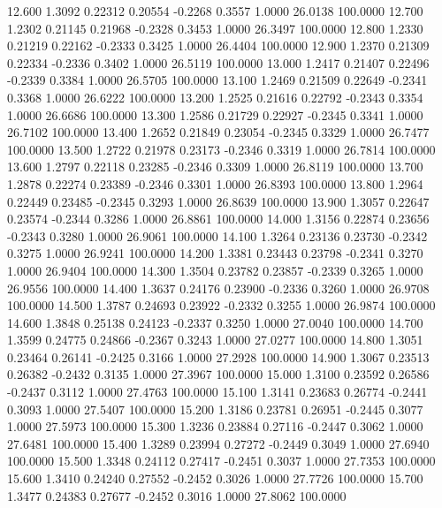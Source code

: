   12.600   1.3092   0.22312   0.20554  -0.2268   0.3557   1.0000  26.0138 100.0000
  12.700   1.2302   0.21145   0.21968  -0.2328   0.3453   1.0000  26.3497 100.0000
  12.800   1.2330   0.21219   0.22162  -0.2333   0.3425   1.0000  26.4404 100.0000
  12.900   1.2370   0.21309   0.22334  -0.2336   0.3402   1.0000  26.5119 100.0000
  13.000   1.2417   0.21407   0.22496  -0.2339   0.3384   1.0000  26.5705 100.0000
  13.100   1.2469   0.21509   0.22649  -0.2341   0.3368   1.0000  26.6222 100.0000
  13.200   1.2525   0.21616   0.22792  -0.2343   0.3354   1.0000  26.6686 100.0000
  13.300   1.2586   0.21729   0.22927  -0.2345   0.3341   1.0000  26.7102 100.0000
  13.400   1.2652   0.21849   0.23054  -0.2345   0.3329   1.0000  26.7477 100.0000
  13.500   1.2722   0.21978   0.23173  -0.2346   0.3319   1.0000  26.7814 100.0000
  13.600   1.2797   0.22118   0.23285  -0.2346   0.3309   1.0000  26.8119 100.0000
  13.700   1.2878   0.22274   0.23389  -0.2346   0.3301   1.0000  26.8393 100.0000
  13.800   1.2964   0.22449   0.23485  -0.2345   0.3293   1.0000  26.8639 100.0000
  13.900   1.3057   0.22647   0.23574  -0.2344   0.3286   1.0000  26.8861 100.0000
  14.000   1.3156   0.22874   0.23656  -0.2343   0.3280   1.0000  26.9061 100.0000
  14.100   1.3264   0.23136   0.23730  -0.2342   0.3275   1.0000  26.9241 100.0000
  14.200   1.3381   0.23443   0.23798  -0.2341   0.3270   1.0000  26.9404 100.0000
  14.300   1.3504   0.23782   0.23857  -0.2339   0.3265   1.0000  26.9556 100.0000
  14.400   1.3637   0.24176   0.23900  -0.2336   0.3260   1.0000  26.9708 100.0000
  14.500   1.3787   0.24693   0.23922  -0.2332   0.3255   1.0000  26.9874 100.0000
  14.600   1.3848   0.25138   0.24123  -0.2337   0.3250   1.0000  27.0040 100.0000
  14.700   1.3599   0.24775   0.24866  -0.2367   0.3243   1.0000  27.0277 100.0000
  14.800   1.3051   0.23464   0.26141  -0.2425   0.3166   1.0000  27.2928 100.0000
  14.900   1.3067   0.23513   0.26382  -0.2432   0.3135   1.0000  27.3967 100.0000
  15.000   1.3100   0.23592   0.26586  -0.2437   0.3112   1.0000  27.4763 100.0000
  15.100   1.3141   0.23683   0.26774  -0.2441   0.3093   1.0000  27.5407 100.0000
  15.200   1.3186   0.23781   0.26951  -0.2445   0.3077   1.0000  27.5973 100.0000
  15.300   1.3236   0.23884   0.27116  -0.2447   0.3062   1.0000  27.6481 100.0000
  15.400   1.3289   0.23994   0.27272  -0.2449   0.3049   1.0000  27.6940 100.0000
  15.500   1.3348   0.24112   0.27417  -0.2451   0.3037   1.0000  27.7353 100.0000
  15.600   1.3410   0.24240   0.27552  -0.2452   0.3026   1.0000  27.7726 100.0000
  15.700   1.3477   0.24383   0.27677  -0.2452   0.3016   1.0000  27.8062 100.0000

